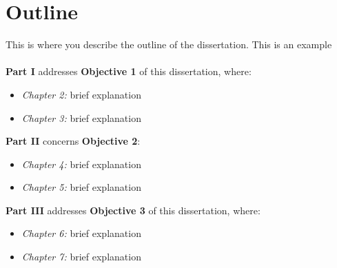 \section{Outline}
This is where you describe the outline of the dissertation. This is an example 
\\ \\
\noindent
\textbf{Part I} addresses \textbf{Objective 1} of this dissertation, where:
\begin{itemize}
\item{\textit{Chapter 2:} brief explanation}
\item{\textit{Chapter 3:} brief explanation}
\end{itemize}

\noindent
\textbf{Part II} concerns \textbf{Objective 2}:
\begin{itemize}
\item{\textit{Chapter 4:} brief explanation}
\item{\textit{Chapter 5:} brief explanation}
\end{itemize}
\noindent
\textbf{Part III} addresses \textbf{Objective 3} of this dissertation, where: 

\begin{itemize}
\item{\textit{Chapter 6:} brief explanation}
\item{\textit{Chapter 7:} brief explanation}
\end{itemize}

\pagebreak


\renewcommand{\thechapter}{\Roman{chapter}}